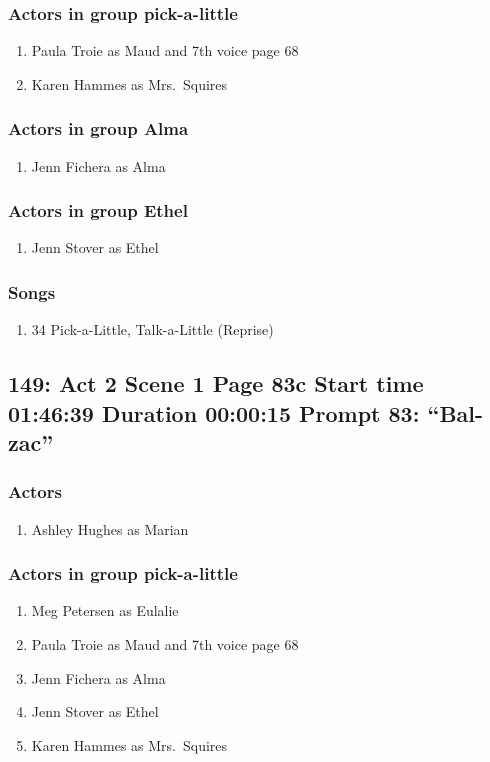 \subsubsection{Actors in group pick-a-little}
\begin{enumerate}
\item Paula Troie as Maud and 7th voice page 68
\item Karen Hammes as Mrs.~Squires
\end{enumerate}
\subsubsection{Actors in group Alma}
\begin{enumerate}
\item Jenn Fichera as Alma
\end{enumerate}
\subsubsection{Actors in group Ethel}
\begin{enumerate}
\item Jenn Stover as Ethel
\end{enumerate}

\subsubsection{Songs}
\begin{enumerate}
\item 34 Pick-a-Little, Talk-a-Little (Reprise)
\end{enumerate}
\subsection{149: Act 2 Scene 1 Page 83c Start time 01:46:39 Duration 00:00:15 Prompt 83: ``Bal-zac''}

\subsubsection{Actors}
\begin{enumerate}
\item Ashley Hughes as Marian
\end{enumerate}
\subsubsection{Actors in group pick-a-little}
\begin{enumerate}
\item Meg Petersen as Eulalie
\item Paula Troie as Maud and 7th voice page 68
\item Jenn Fichera as Alma
\item Jenn Stover as Ethel
\item Karen Hammes as Mrs.~Squires
\end{enumerate}

